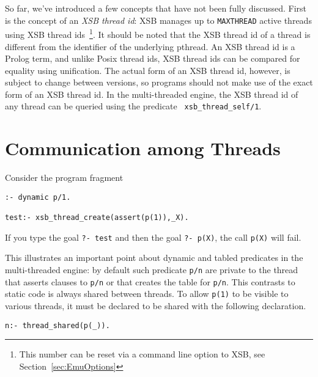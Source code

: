 So far, we've introduced a few concepts that have not been fully
discussed.  First is the concept of an {\em XSB thread id}: XSB
manages up to {\tt MAXTHREAD} active threads using XSB thread
ids~\footnote{This number can be reset via a command line option to
  XSB, see Section~\ref{sec:EmuOptions}}.  It should be noted that the
XSB thread id of a thread is different from the identifier of the
underlying pthread.  An XSB thread id is a Prolog term, and unlike
Posix thread ids, XSB thread ids can be compared for equality using
unification.  The actual form of an XSB thread id, however, is subject
to change between versions, so programs should not make use of the
exact form of an XSB thread id.  In the multi-threaded engine, the XSB
thread id of any thread can be queried using the predicate {\tt
  xsb\_thread\_self/1}.

\section{Communication among Threads}

\begin{example}
Consider the program fragment
%
\begin{verbatim}
:- dynamic p/1.

test:- xsb_thread_create(assert(p(1)),_X).
\end{verbatim}
If you type the goal {\tt ?- test} and then the goal {\tt ?- p(X)},
the call {\tt p(X)} will fail.  
\end{example}

This illustrates an important point about dynamic and tabled
predicates in the multi-threaded engine: by default such predicate
{\tt p/n} are private to the thread that asserts clauses to {\tt p/n}
or that creates the table for {\tt p/n}.  This contrasts to static
code is always shared between threads.  To allow {\tt p(1)} to be
visible to various threads, it must be declared to be shared with the
following declaration.
%
\begin{verbatim}
n:- thread_shared(p(_)).
\end{verbatim}

